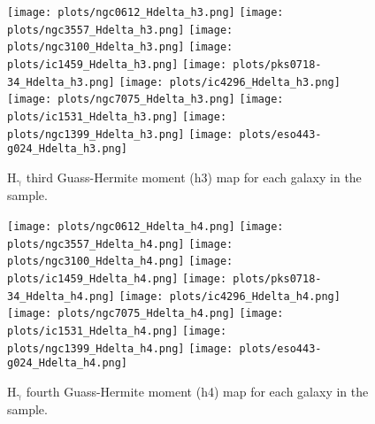 \documentclass[fleqn,usenatbib,useAMS]{mnras}
\begin{document}
        \begin{figure*}
            \centering
            \texttt{[image: plots/ngc0612\_Hdelta\_h3.png]}
            \texttt{[image: plots/ngc3557\_Hdelta\_h3.png]}
            \texttt{[image: plots/ngc3100\_Hdelta\_h3.png]}
            \texttt{[image: plots/ic1459\_Hdelta\_h3.png]}
            \texttt{[image: plots/pks0718-34\_Hdelta\_h3.png]}
            \texttt{[image: plots/ic4296\_Hdelta\_h3.png]}
            \texttt{[image: plots/ngc7075\_Hdelta\_h3.png]}
            \texttt{[image: plots/ic1531\_Hdelta\_h3.png]}
            \texttt{[image: plots/ngc1399\_Hdelta\_h3.png]}
            \texttt{[image: plots/eso443-g024\_Hdelta\_h3.png]}
            \caption{H$_\mathrm{\gamma}$ third Guass-Hermite moment (h3) map for each galaxy in the sample.}
            \label{fig:Hdelta_h3}
        \end{figure*}


        \begin{figure*}
            \centering
            \texttt{[image: plots/ngc0612\_Hdelta\_h4.png]}
            \texttt{[image: plots/ngc3557\_Hdelta\_h4.png]}
            \texttt{[image: plots/ngc3100\_Hdelta\_h4.png]}
            \texttt{[image: plots/ic1459\_Hdelta\_h4.png]}
            \texttt{[image: plots/pks0718-34\_Hdelta\_h4.png]}
            \texttt{[image: plots/ic4296\_Hdelta\_h4.png]}
            \texttt{[image: plots/ngc7075\_Hdelta\_h4.png]}
            \texttt{[image: plots/ic1531\_Hdelta\_h4.png]}
            \texttt{[image: plots/ngc1399\_Hdelta\_h4.png]}
            \texttt{[image: plots/eso443-g024\_Hdelta\_h4.png]}
            \caption{H$_\mathrm{\gamma}$ fourth Guass-Hermite moment (h4) map for each galaxy in the sample.}
            \label{fig:Hdelta_h4}
        \end{figure*}
\end{document}
